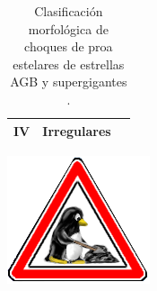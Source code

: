 \begin{table}
\begin{tabular}{llc}
    IV & Irregulares & \\
    \bottomrule
  \end{tabular}
  \caption{Clasificación morfológica de choques de proa estelares de estrellas AGB y supergigantes \citep{Cox:2012}.}
  \label{tab:morphology-AGB}
\end{table}


\includegraphics[width=0.1\linewidth]{./Figures/tux-development}
